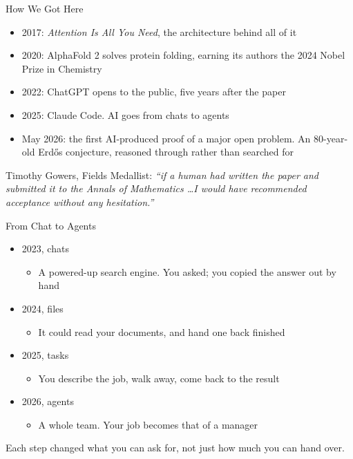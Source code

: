 \documentclass[aspectratio=169]{beamer}
\begin{document}
\begin{frame}{How We Got Here}
    \begin{itemize}\setlength{\itemsep}{7pt}
        \item 2017: \textit{Attention Is All You Need}, the architecture behind all of it
        \item 2020: AlphaFold 2 solves protein folding, earning its authors the 2024
              Nobel Prize in Chemistry
        \item 2022: ChatGPT opens to the public, five years after the paper
        \item 2025: Claude Code. AI goes from chats to agents
        \item May 2026: the first AI-produced proof of a major open problem. An 80-year-old
              Erd\H{o}s conjecture, reasoned through rather than searched for
    \end{itemize}

    \vspace{0.9em}
    Timothy Gowers, Fields Medallist: \textit{``if a human had written the paper and
    submitted it to the Annals of Mathematics \ldots I would have recommended acceptance
    without any hesitation.''}
\end{frame}

\begin{frame}{From Chat to Agents}
    \begin{itemize}
        \item 2023, chats
        \begin{itemize}
            \item A powered-up search engine. You asked; you copied the answer out by hand
        \end{itemize}
        \item 2024, files
        \begin{itemize}
            \item It could read your documents, and hand one back finished
        \end{itemize}
        \item 2025, tasks
        \begin{itemize}
            \item You describe the job, walk away, come back to the result
        \end{itemize}
        \item 2026, agents
        \begin{itemize}
            \item A whole team. Your job becomes that of a manager
        \end{itemize}
    \end{itemize}

    \vspace{1.2em}
Each step changed what you can ask for, not just how much you can hand over.
\end{frame}
\end{document}
